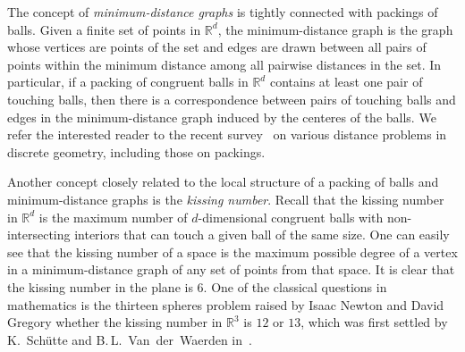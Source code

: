 The concept of \emph{minimum-distance graphs} is tightly connected with packings of balls.
Given a finite set of points in $\mathbb{R}^d$, the minimum-distance graph is the graph whose vertices are points of the set and edges are drawn between all pairs of points within the minimum distance among all pairwise distances in the set. In particular, if a packing of congruent balls in $\mathbb{R}^d$ contains at least one pair of touching balls, then there is a correspondence between pairs of touching balls and edges in the minimum-distance graph induced by the centeres of the balls. %
We refer the interested reader to the recent survey~\cite{Swanepoel2018} on various distance problems in discrete geometry, including those on packings.


Another concept closely related to the local structure of a packing of balls and minimum-distance graphs is the \emph{kissing number}. Recall that the kissing number in $\mathbb{R}^d$ is the maximum number of $d$-dimensional congruent balls with non-intersecting interiors that can touch a given ball of the same size. One can easily see that the kissing number of a space is the maximum possible degree of a vertex in a minimum-distance graph of any set of points from that space.
It is clear that the kissing number in the plane is $6$. One of the classical questions in mathematics is the thirteen spheres problem raised by Isaac Newton and David Gregory whether the kissing number in $\mathbb{R}^3$ is $12$ or $13$, which was first settled by K.~Sch\"{u}tte and B.\,L.~Van~der~Waerden in~\cite{schutte1952problem}. %

